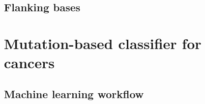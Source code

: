 \subsection{Flanking bases}\label{methods:nbr}



\section{Mutation-based classifier for cancers}\label{methods:ml}

\subsection{Machine learning workflow}\label{methods:ml_workflow}

